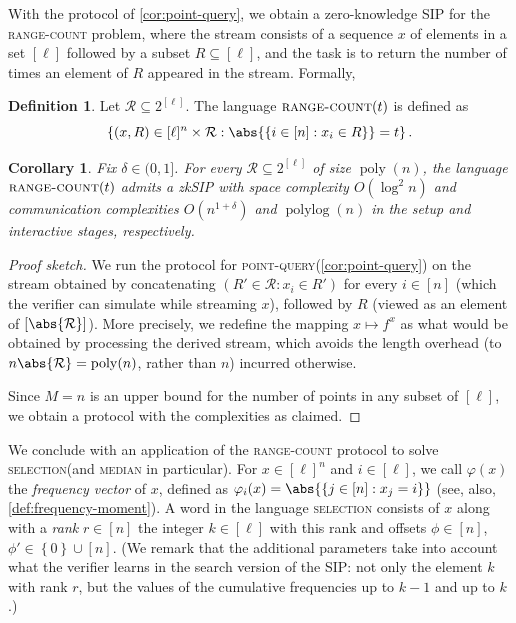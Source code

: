\documentclass[10pt,a4paper]{article}
\newtheorem{corollary}[theorem]{Corollary}
\theoremstyle{definition}
\newtheorem{definition}[theorem]{Definition}
\newcommand{\zksip}{\textrm{zkSIP}}
\renewcommand{\set}[1]{\left\{#1\right\}}
\newcommand{\poly}{\operatorname{poly}}
\newcommand{\polylog}{\operatorname{polylog}}
\newcommand{\pointquery}{\normalfont\textsc{point-query}\xspace}
\newcommand{\rangecount}{\normalfont\textsc{range-count}\xspace}
\newcommand{\selection}{\normalfont\textsc{selection}\xspace}
\newcommand{\median}{\normalfont\textsc{median}\xspace}
\begin{document}
With the protocol of \cref{cor:point-query}, we obtain a zero-knowledge SIP for the \rangecount problem, where the stream consists of a sequence $x$ of elements in a set $[\ell]$ followed by a subset $R \subseteq [\ell]$, and the task is to return the number of times an element of $R$ appeared in the stream. Formally,
\begin{definition}
  \label{def:range-count}
  Let $\mathcal{R} \subseteq 2^{[\ell]}$. The language $\rangecount(t)$ is defined as
  \begin{equation*}
      \set{(x, R) \in [\ell]^n \times \mathcal{R} : \abs{\set{i \in [n]: x_i \in R}} = t}.
  \end{equation*}
\end{definition}
\begin{corollary}
    \label{cor:range-count}
    Fix $\delta \in (0,1]$. For every $\mathcal{R} \subseteq 2^{[\ell]}$ of size $\poly(n)$, the language $\rangecount(t)$ admits a \zksip{} with space complexity $O(\log^2 n)$ and communication complexities $O(n^{1 + \delta})$ and $\polylog(n)$ in the setup and interactive stages, respectively. 
\end{corollary}
\begin{proof}[Proof sketch]
    We run the protocol for \pointquery (\cref{cor:point-query}) on the stream obtained by concatenating $(R' \in \mathcal{R} : x_i \in R')$ for every $i \in [n]$ (which the verifier can simulate while streaming $x$), followed by $R$ (viewed as an element of $[\abs{\mathcal{R}}]$). More precisely, we redefine the mapping $x \mapsto f^x$ as what would be obtained by processing the derived stream, which avoids the length overhead (to $n \abs{\mathcal{R}} = \poly(n)$, rather than $n$) incurred otherwise.
    
    Since $M = n$ is an upper bound for the number of points in any subset of $[\ell]$, we obtain a protocol with the complexities as claimed.
\end{proof}

We conclude with an application of the \rangecount protocol to solve \selection (and \median in particular). For $x \in [\ell]^n$ and $i \in [\ell]$, we call $\varphi(x)$ the \emph{frequency vector} of $x$, defined as $\varphi_i(x) = \abs{\set{j \in [n] : x_j = i}}$ (see, also, \cref{def:frequency-moment}). A word in the language \selection consists of $x$ along with a \emph{rank} $r \in [n]$ the integer $k \in [\ell]$ with this rank and offsets $\phi \in [n]$, $\phi' \in \set{0} \cup [n]$. (We remark that the additional parameters take into account what the verifier learns in the search version of the SIP: not only the element $k$ with rank $r$, but the values of the cumulative frequencies up to $k - 1$ and up to $k$.)
\end{document}
